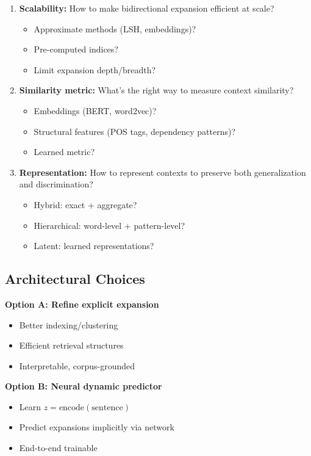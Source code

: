 \documentclass[11pt]{article}
\begin{document}
\begin{enumerate}
\item \textbf{Scalability:} How to make bidirectional expansion efficient at scale?
    \begin{itemize}
    \item Approximate methods (LSH, embeddings)?
    \item Pre-computed indices?
    \item Limit expansion depth/breadth?
    \end{itemize}

\item \textbf{Similarity metric:} What's the right way to measure context similarity?
    \begin{itemize}
    \item Embeddings (BERT, word2vec)?
    \item Structural features (POS tags, dependency patterns)?
    \item Learned metric?
    \end{itemize}

\item \textbf{Representation:} How to represent contexts to preserve both generalization and discrimination?
    \begin{itemize}
    \item Hybrid: exact + aggregate?
    \item Hierarchical: word-level + pattern-level?
    \item Latent: learned representations?
    \end{itemize}
\end{enumerate}

\subsection{Architectural Choices}

\textbf{Option A: Refine explicit expansion}
\begin{itemize}
\item Better indexing/clustering
\item Efficient retrieval structures
\item Interpretable, corpus-grounded
\end{itemize}

\textbf{Option B: Neural dynamic predictor}
\begin{itemize}
\item Learn $z = \text{encode}(\text{sentence})$
\item Predict expansions implicitly via network
\item End-to-end trainable
\end{itemize}
\end{document}

